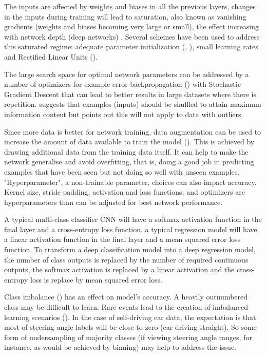 The inputs are affected by weights and biases in all the previous layers, changes in the inputs during training will lead to saturation, also known as vanishing gradients (weights and biases becoming very large or small), the effect increasing with network depth (deep networks) . Several schemes have been used to address this saturated regime: adequate parameter initialization (\cite{glorot2010understanding}, \cite{saxe2013exact}), small learning rates
and Rectified Linear Units (\cite{nair2010rectified}).

The large search space for optimal network parameters can be addressed by a number of optimizers for example error backpropagation (\cite{rumelhart1986learning}) with Stochastic Gradient Descent that can lead to better results in large datasets where there is repetition. \cite{lecun2012efficient} suggests that examples (inputs) should be shuffled to attain maximum information content but points out this will not apply to data with outliers.

Since more data is better for network training, data augmentation can be used to increase the amount of data available to train the model (\cite{perez2017effectiveness}). This is achieved by drawing additional data from the training data itself. It can help to make the network generalise and avoid overfitting, that is, doing a good job in predicting examples that have been seen but not doing so well with unseen examples.
"Hyperparameter", a non-trainable parameter, choices can also impact accuracy. Kernel size, stride padding, activation and loss functions, and optimizers are hyperparameters than can be adjusted for best network performance.

A typical multi-class classifier CNN will have a softmax activation function in the final layer and a cross-entropy loss function. a typical regression model will have a linear activation function in the final layer and a mean squared error loss function.
To transform a deep classification model into a deep regression model, the number of class outputs is replaced by the number of required continuous outputs, the softmax activation is replaced by a linear activation and the cross-entropy loss is replace by mean squared error loss.

Class imbalance (\cite{batista2004study}) has an effect on model's accuracy. A heavily outnumbered class may be difficult to learn. Rare events lead to the creation of imbalanced learning scenarios (\cite{krawczyk2016learning}). In the case of self-driving car data, the expectation is that most of steering angle labels will be close to zero (car driving straight). So some form of undersampling of majority classes (if viewing steering angle ranges, for instance, as would be achieved by binning) may help to address the issue.



